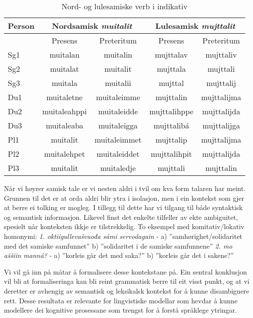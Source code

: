 \documentclass[a4paper,norsk]{article}
\begin{document}
\begin{table}[htdp]
\caption{Nord- og lulesamiske verb i indikativ}
\begin{center}
\begin{tabular}{|l|c|c||c|c|}
\hline
Person & \multicolumn{2}{|c||}{Nordsamisk \textit{muitalit}} & \multicolumn{2}{|c|}{Lulesamisk \textit{mujttalit}} \\
\hline
 & Presens & Preteritum & Presens & Preteritum \\
\hline \hline 
Sg1 & muitalan & muitalin &  mujttalav & mujttaliv \\
\hline
Sg2 & muitalat & muitalit & mujttala & mujttali \\
\hline
Sg3 & muitala & muitalii & mujttal & mujttalij \\
\hline
\hline
Du1  & muitaletne & muitaleimme & mujttalin & mujttalijma \\
\hline
Du2 & muitaleahppi & muitaleidde & mujttalihppe & mujttalijda \\
\hline
Du3 & muitaleaba & muitaleigga & mujttalibá & mujttalijga \\
\hline
\hline
Pl1  & muitalit & muitaleimmet & mujttalip & mujttalijma \\
\hline
Pl2 & muitalehpet & muitaleiddet & mujttalihpit & mujttalijda  \\
\hline
Pl3 & muitalit & muitaledje & mujttali & mujttalin \\
\hline
\hline
\end{tabular}
\end{center}
\label{verb}
\end{table}%

Når vi høyrer samisk tale er vi nesten aldri i tvil om kva form talaren har meint. Grunnen til det er at orda aldri blir ytra i isolasjon, men i ein kontekst som gjer at berre ei tolking er mogleg. I tillegg til dette har vi tilgang til både syntaktisk og semantisk informasjon. Likevel finst det enkelte tilfeller av ekte ambiguitet, spesielt når konteksten ikkje er tilstrekkelig. To eksempel med komitativ/lokativ homonymi: \textit{1. oktiigullevašvuođa sámi servodagain}  - a) ''samhørighet/solidaritet med det samiske samfunnet'' b) ''solidaritet i de samiske samfunnene'' \textit{2. mo aššiin manná?} - a) ''korleis går det med saka?'' b) ''korleis går det i sakene?'' 

Vi vil gå inn på måtar å formalisere desse kontekstane på. Ein sentral konklusjon vil bli at formaliseringa kan bli reint grammatisk berre til eit visst punkt, og at vi deretter er avhengig av semantisk og leksikalsk kontekst for å kunne disambiguere rett. Desse resultata er relevante for lingvistiske modellar som hevdar å kunne modellere dei kognitive prosessane som trengst for å forstå språklege ytringar.%
\end{document}

